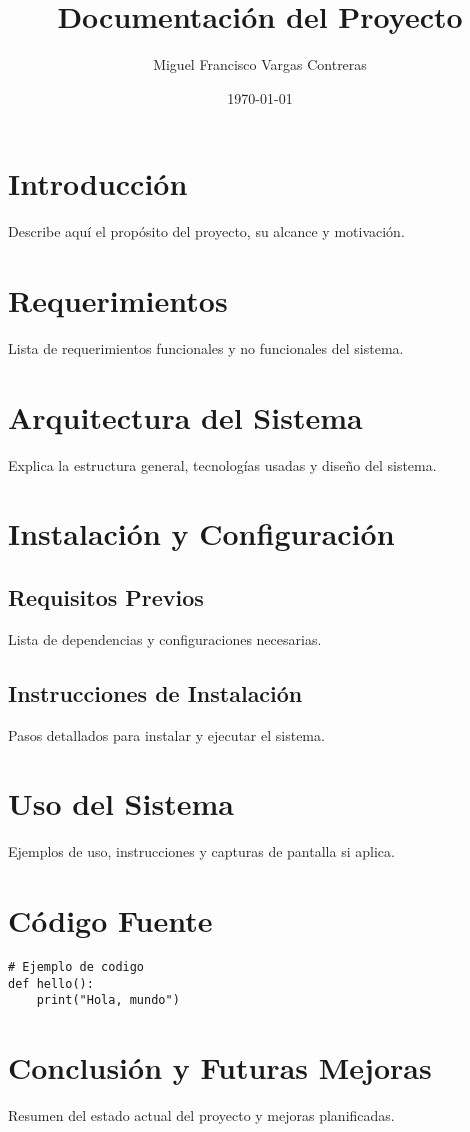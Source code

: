 \documentclass[a4paper,12pt]{article}
\title{Documentación del Proyecto}
\author{Miguel Francisco Vargas Contreras}
\date{\today}
\begin{document}
\maketitle
\tableofcontents
\newpage

\section{Introducción}
Describe aquí el propósito del proyecto, su alcance y motivación.

\section{Requerimientos}
Lista de requerimientos funcionales y no funcionales del sistema.

\section{Arquitectura del Sistema}
Explica la estructura general, tecnologías usadas y diseño del sistema.

\section{Instalación y Configuración}
\subsection{Requisitos Previos}
Lista de dependencias y configuraciones necesarias.
\subsection{Instrucciones de Instalación}
Pasos detallados para instalar y ejecutar el sistema.

\section{Uso del Sistema}
Ejemplos de uso, instrucciones y capturas de pantalla si aplica.

\section{Código Fuente}
\begin{lstlisting}
# Ejemplo de codigo
def hello():
    print("Hola, mundo")
\end{lstlisting}

\section{Conclusión y Futuras Mejoras}
Resumen del estado actual del proyecto y mejoras planificadas.
\end{document}
